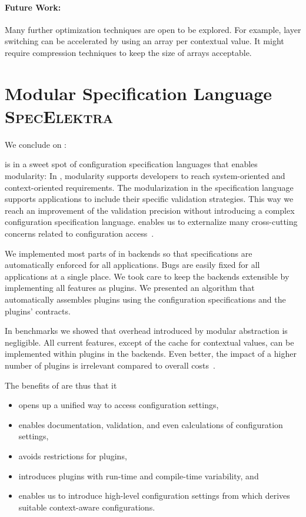 \paragraph{Future Work:} Many further optimization techniques are open to be explored.
For example, layer switching can be accelerated by using an array per contextual value.
It might require compression techniques to keep the size of arrays acceptable.











\section{Modular Specification Language \textsc{SpecElektra}}
\label{sec:conclusion-language}

We conclude on :
\goalAbstraction*

 is in a sweet spot of configuration specification languages that enables modularity:
In , modularity supports developers to reach system-oriented and context-oriented requirements.
The modularization in the specification language supports applications to include their specific validation strategies.
This way we reach an improvement of the validation precision without introducing a complex configuration specification language.
 enables us to externalize many cross-cutting concerns related to configuration access~\cite{raab2016improving}.


We implemented most parts of  in backends so that specifications are automatically enforced for all applications.
Bugs are easily fixed for all applications at a single place.
We took care to keep the backends extensible by implementing all features as plugins.
We presented an algorithm that automatically assembles plugins using the configuration specifications and the plugins' contracts.

In benchmarks we showed that overhead introduced by modular abstraction is negligible.
All current features, except of the cache for contextual values, can be implemented within plugins in the backends.
Even better, the impact of a higher number of plugins is irrelevant compared to overall costs~\cite{raab2016improving}.

The benefits of  are thus that it~\cite{raab2016improving}
\begin{itemize}
\item opens up a unified way to access configuration settings,
\item enables documentation, validation, and even calculations of configuration settings,
\item avoids restrictions for plugins,
\item introduces plugins with run-time and compile-time variability, and
\item enables us to introduce high-level configuration settings from which \elektra{} derives suitable context-aware configurations.
\end{itemize}


